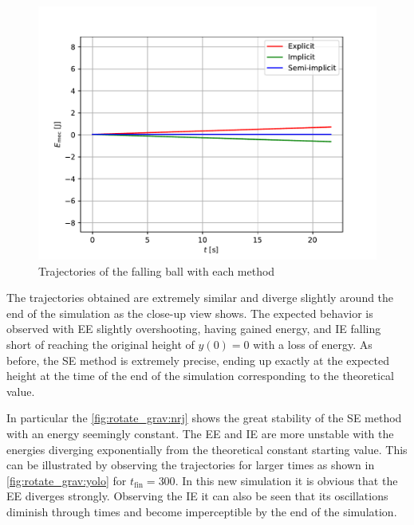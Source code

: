 \begin{figure}[h]
    \centering
    \includegraphics[width=0.7\linewidth]{figures/rotate_grav_energy.pdf}
    \caption{Trajectories of the falling ball with each method}
    \label{fig:rotate_grav:nrj}
\end{figure}


The trajectories obtained are extremely similar and diverge slightly around the end of the simulation as the close-up view shows. The expected behavior is observed with EE slightly overshooting, having gained energy, and IE falling short of reaching the original height of $y(0) = 0$ with a loss of energy. As before, the SE method is extremely precise, ending up exactly at the expected height at the time of the end of the simulation corresponding to the theoretical value.

In particular the \autoref{fig:rotate_grav:nrj} shows the great stability of the SE method with an energy seemingly constant. The EE and IE are more unstable with the energies diverging exponentially from the theoretical constant starting value. This can be illustrated by observing the trajectories for larger times as shown in \autoref{fig:rotate_grav:yolo} for $t_\mathrm{fin} = 300$. In this new simulation it is obvious that the EE diverges strongly. Observing the IE it can also be seen that its oscillations diminish through times and become imperceptible by the end of the simulation.

